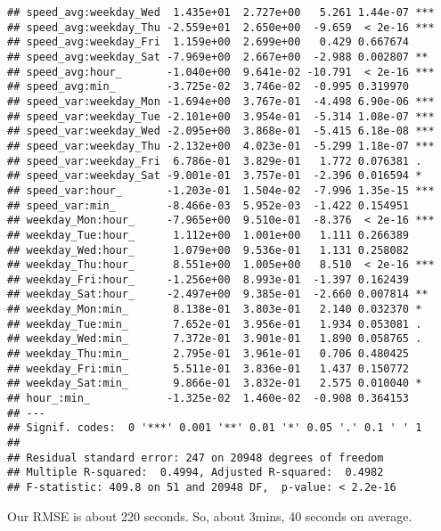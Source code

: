 \documentclass[]{article}
\newenvironment{Shaded}{\begin{snugshade}}{\end{snugshade}}
\newcommand{\DecValTok}[1]{\textcolor[rgb]{0.00,0.00,0.81}{#1}}
\newcommand{\KeywordTok}[1]{\textcolor[rgb]{0.13,0.29,0.53}{\textbf{#1}}}
\newcommand{\NormalTok}[1]{#1}
\newcommand{\OperatorTok}[1]{\textcolor[rgb]{0.81,0.36,0.00}{\textbf{#1}}}
\newcommand{\StringTok}[1]{\textcolor[rgb]{0.31,0.60,0.02}{#1}}
\begin{document}
\begin{verbatim}
## speed_avg:weekday_Wed  1.435e+01  2.727e+00   5.261 1.44e-07 ***
## speed_avg:weekday_Thu -2.559e+01  2.650e+00  -9.659  < 2e-16 ***
## speed_avg:weekday_Fri  1.159e+00  2.699e+00   0.429 0.667674    
## speed_avg:weekday_Sat -7.969e+00  2.667e+00  -2.988 0.002807 ** 
## speed_avg:hour_       -1.040e+00  9.641e-02 -10.791  < 2e-16 ***
## speed_avg:min_        -3.725e-02  3.746e-02  -0.995 0.319970    
## speed_var:weekday_Mon -1.694e+00  3.767e-01  -4.498 6.90e-06 ***
## speed_var:weekday_Tue -2.101e+00  3.954e-01  -5.314 1.08e-07 ***
## speed_var:weekday_Wed -2.095e+00  3.868e-01  -5.415 6.18e-08 ***
## speed_var:weekday_Thu -2.132e+00  4.023e-01  -5.299 1.18e-07 ***
## speed_var:weekday_Fri  6.786e-01  3.829e-01   1.772 0.076381 .  
## speed_var:weekday_Sat -9.001e-01  3.757e-01  -2.396 0.016594 *  
## speed_var:hour_       -1.203e-01  1.504e-02  -7.996 1.35e-15 ***
## speed_var:min_        -8.466e-03  5.952e-03  -1.422 0.154951    
## weekday_Mon:hour_     -7.965e+00  9.510e-01  -8.376  < 2e-16 ***
## weekday_Tue:hour_      1.112e+00  1.001e+00   1.111 0.266389    
## weekday_Wed:hour_      1.079e+00  9.536e-01   1.131 0.258082    
## weekday_Thu:hour_      8.551e+00  1.005e+00   8.510  < 2e-16 ***
## weekday_Fri:hour_     -1.256e+00  8.993e-01  -1.397 0.162439    
## weekday_Sat:hour_     -2.497e+00  9.385e-01  -2.660 0.007814 ** 
## weekday_Mon:min_       8.138e-01  3.803e-01   2.140 0.032370 *  
## weekday_Tue:min_       7.652e-01  3.956e-01   1.934 0.053081 .  
## weekday_Wed:min_       7.372e-01  3.901e-01   1.890 0.058765 .  
## weekday_Thu:min_       2.795e-01  3.961e-01   0.706 0.480425    
## weekday_Fri:min_       5.511e-01  3.836e-01   1.437 0.150772    
## weekday_Sat:min_       9.866e-01  3.832e-01   2.575 0.010040 *  
## hour_:min_            -1.325e-02  1.460e-02  -0.908 0.364153    
## ---
## Signif. codes:  0 '***' 0.001 '**' 0.01 '*' 0.05 '.' 0.1 ' ' 1
## 
## Residual standard error: 247 on 20948 degrees of freedom
## Multiple R-squared:  0.4994, Adjusted R-squared:  0.4982 
## F-statistic: 409.8 on 51 and 20948 DF,  p-value: < 2.2e-16
\end{verbatim}

Our RMSE is about 220 seconds. So, about 3mins, 40 seconds on average.

\begin{Shaded}
\end{Shaded}
\end{document}
